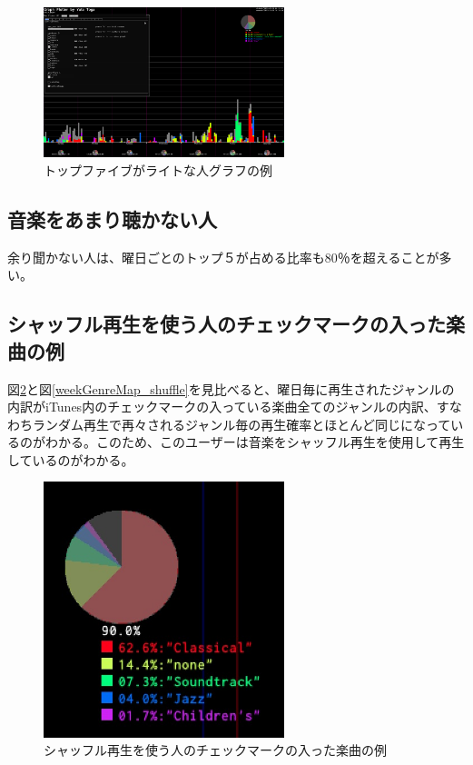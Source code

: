 \documentclass[11pt, twocolumn]{jsarticle}
\begin{document}
\begin{figure}[h]
\begin{center}
\includegraphics[width=7cm]{topFive_light.png}
\caption{トップファイブがライトな人グラフの例}
\label{topFive_heavy}
\end{center}
\end{figure}

\subsection{音楽をあまり聴かない人}
余り聞かない人は、曜日ごとのトップ５が占める比率も80％を超えることが多い。

\subsection{シャッフル再生を使う人のチェックマークの入った楽曲の例}
図\ref{checkedItemsGenreMap_shuffle}と図\ref{weekGenreMap_shuffle}を見比べると、曜日毎に再生されたジャンルの内訳がiTunes内のチェックマークの入っている楽曲全てのジャンルの内訳、すなわちランダム再生で再々されるジャンル毎の再生確率とほとんど同じになっているのがわかる。このため、このユーザーは音楽をシャッフル再生を使用して再生しているのがわかる。

\begin{figure}[h]
\begin{center}
\includegraphics[width=7cm]{taru_checkedItemGenreRatio.jpg}
\caption{シャッフル再生を使う人のチェックマークの入った楽曲の例}
\label{checkedItemsGenreMap_shuffle}
\end{center}
\end{figure}
\end{document}
